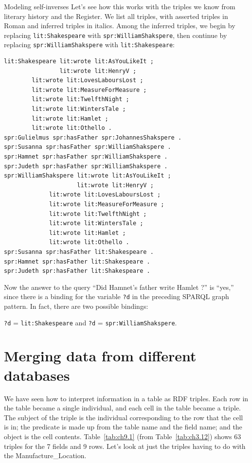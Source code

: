 \begin{challenge}{Modeling self-inverses}
Let's see how this works with the triples we know from literary history
and the Register. We list all triples, with asserted triples in Roman
and inferred triples in italics. Among the inferred triples, we
begin by replacing \texttt{lit:Shakespeare} with \texttt{spr:WilliamShakspere}, then
continue by replacing \texttt{spr:WilliamShakspere} with \texttt{lit:Shakespeare}:

\begin{lstlisting}
lit:Shakespeare lit:wrote lit:AsYouLikeIt ;
                lit:wrote lit:HenryV ;
		lit:wrote lit:LovesLaboursLost ;
		lit:wrote lit:MeasureForMeasure ;
		lit:wrote lit:TwelfthNight ;
		lit:wrote lit:WintersTale ;
		lit:wrote lit:Hamlet ;
		lit:wrote lit:Othello .
spr:Gulielmus spr:hasFather spr:JohannesShakspere .
spr:Susanna spr:hasFather spr:WilliamShakspere .
spr:Hamnet spr:hasFather spr:WilliamShakspere .
spr:Judeth spr:hasFather spr:WilliamShakspere .
spr:WilliamShakspere lit:wrote lit:AsYouLikeIt ;  
                     lit:wrote lit:HenryV ;
		     lit:wrote lit:LovesLaboursLost ;
		     lit:wrote lit:MeasureForMeasure ;
		     lit:wrote lit:TwelfthNight ;
		     lit:wrote lit:WintersTale ;
		     lit:wrote lit:Hamlet ;
		     lit:wrote lit:Othello .
spr:Susanna spr:hasFather lit:Shakespeare .
spr:Hamnet spr:hasFather lit:Shakespeare .
spr:Judeth spr:hasFather lit:Shakespeare .
\end{lstlisting}

Now the answer to the query ``Did Hamnet's father write Hamlet ?'' is
``yes,'' since there is a binding for the variable \texttt{?d} in the preceding
SPARQL graph pattern. In fact, there are two possible bindings:

\texttt{?d} = \texttt{lit:Shakespeare} and \texttt{?d} = \texttt{spr:WilliamShakspere}.
\end{challenge}


\section{Merging data from different databases}

We have seen how to interpret information in a table as RDF triples.
Each row in the table became a single individual, and each cell in the
table became a triple. The subject of the triple is the individual
corresponding to the row that the cell is in; the predicate is made up
from the table name and the field name; and the object is the cell
contents. Table~\ref{tab:ch9.1} (from Table~\ref{tab:ch3.12}) shows
63 triples for the 7 fields and 9 rows. Let's look at just the triples
having to do with the
Manufacture\_Location.

